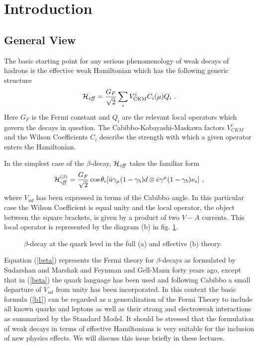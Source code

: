 \documentclass[12pt]{article}
\newcommand{\be}{\begin{equation}}
\newcommand{\ee}{\end{equation}}
\begin{document}
\setcounter{page}{1}

\section{Introduction}
\subsection{General View}
The basic starting point for any serious phenomenology of weak decays of
hadrons is the effective weak Hamiltonian which has the following generic
structure
\be\label{b1}
{\cal H}_{\it eff}=\frac{G_F}{\sqrt{2}}\sum_i V^i_{\rm CKM}C_i(\mu)Q_i~.
\ee
Here $G_F$ is the Fermi constant and $Q_i$ are the relevant local
operators which govern the decays in question. The Cabibbo-Kobayashi-Maskawa
factors $V^i_{CKM}$ \cite{CAB,KM} 
and the Wilson Coefficients $C_i$ \cite{OPE,ZIMM} describe the 
strength with which a given operator enters the Hamiltonian.

In the simplest case of the $\beta$-decay, ${\cal H}_{\it eff}$ takes 
the familiar form
\be\label{beta}
{\cal H}^{(\beta)}_{\it eff}=\frac{G_F}{\sqrt{2}}
\cos\theta_c[\bar u\gamma_\mu(1-\gamma_5)d \otimes
\bar e \gamma^\mu (1-\gamma_5)\nu_e]~,
\ee
where $V_{ud}$ has been expressed in terms of the Cabibbo angle. In this
particular case the Wilson Coefficient is equal unity and the local
operator, the object between the square brackets, is given by a product 
of two $V-A$ currents. This local operator is represented by the
diagram (b) in fig. \ref{L:1}.
\begin{figure}[hbt]
\vspace{0.10in}
\centerline{
\epsfysize=1.9in
}%
\vspace{0.08in}
\caption[]{
$\beta$-decay at the quark level in the full (a) and effective (b)
theory.
\label{L:1}}
\end{figure}
Equation (\ref{beta}) represents the Fermi theory for $\beta$-decays 
as formulated by Sudarshan and
Marshak \cite{SUMA} and Feynman and Gell-Mann \cite{GF} forty years ago, 
except that in (\ref{beta})
the quark language has been used and following Cabibbo a small departure of
$V_{ud}$ from unity has been incorporated. In this context the basic 
formula (\ref{b1})
can be regarded as a generalization of the Fermi Theory to include all known
quarks and leptons as well as their strong and electroweak interactions as
summarized by the Standard Model. It should be stressed that the formulation
of weak decays in terms of effective Hamiltonians is very suitable for the
inclusion of new physics effects. We will discuss this issue briefly in these
lectures.
\end{document}
